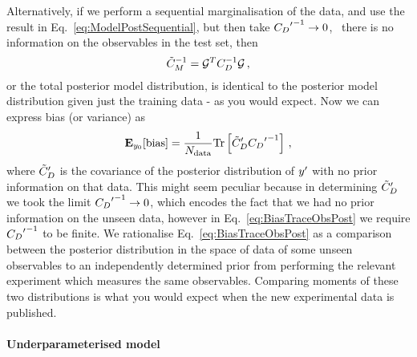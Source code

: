 Alternatively, if we perform a sequential marginalisation of
the data, and use the result in Eq.~\ref{eq:ModelPostSequential}, but
then take ${{C_{D}}^{\prime}}^{-1} \to 0$, \ie\ there is no information
on the observables in the test set, then
\begin{equation}
    \tilde{C}_M^{-1} = \mathcal{G}^T C_{D}^{-1} \mathcal{G} \, ,
\end{equation}
or the total posterior model distribution, is identical to the posterior model
distribution given just the training data - as you would expect.
Now we can express bias (or variance) as
\begin{equation}\label{eq:BiasTraceObsPost}
    \mathbf{E}_{y_0}[{\rm bias}] = \frac{1}{N_{\rm data}}
    {\rm Tr} \left[
        {{\tilde{C}_D}^{\prime}}
        {{C_{D}}^{\prime}}^{-1}
    \right] \, ,
\end{equation}
where ${{\tilde{C}_D}^{\prime}}$ is the covariance of the posterior distribution of
${{y}^{\prime}}$ with no prior information on that data. This might seem
peculiar because in determining ${{\tilde{C}_D}^{\prime}}$ we took the limit
${{C_{D}}^{\prime}}^{-1} \to 0$, which encodes the fact that we had no prior
information on the unseen data, however in Eq.~\ref{eq:BiasTraceObsPost} we
require ${{C_{D}}^{\prime}}^{-1}$ to be finite. We rationalise
Eq.~\ref{eq:BiasTraceObsPost} as a comparison between the posterior distribution
in the space of data of some unseen observables to an independently determined
prior from performing the relevant experiment which measures the same
observables. Comparing moments of these two distributions is what you would
expect when the new experimental data is published.


\paragraph{Underparameterised model}

